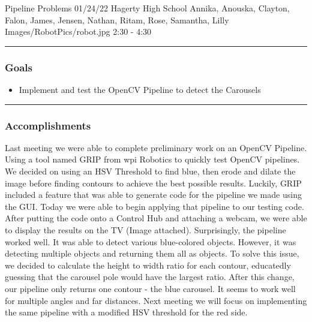 \insertmeeting 
	{Pipeline Problems} 
	{01/24/22} 
	{Hagerty High School}
	{Annika, Anouska, Clayton, Falon, James, Jensen, Nathan, Ritam, Rose, Samantha, Lilly}
	{Images/RobotPics/robot.jpg}
	{2:30 - 4:30}
	
\noindent\hfil\rule{\textwidth}{.4pt}\hfil
\subsubsection*{Goals}
\begin{itemize}
    \item Implement and test the OpenCV Pipeline to detect the Carousels

\end{itemize} 

\noindent\hfil\rule{\textwidth}{.4pt}\hfil

\subsubsection*{Accomplishments}
Last meeting we were able to complete preliminary work on an OpenCV Pipeline. Using a tool named GRIP from wpi Robotics to quickly test OpenCV pipelines. We decided on using an HSV Threshold to find blue, then erode and dilate the image before finding contours to achieve the best possible results. Luckily, GRIP included a feature that was able to generate code for the pipeline we made using the GUI. Today we were able to begin applying that pipeline to our testing code. After putting the code onto a Control Hub and attaching a webcam, we were able to display the results on the TV (Image attached). Surprisingly, the pipeline worked well. It was able to detect various blue-colored objects. However, it was detecting multiple objects and returning them all as objects. To solve this issue, we decided to calculate the height to width ratio for each contour, educatedly guessing that the carousel pole would have the largest ratio. After this change, our pipeline only returns one contour - the blue carousel. It seems to work well for multiple angles and far distances. Next meeting we will focus on implementing the same pipeline with a modified HSV threshold for the red side. 

